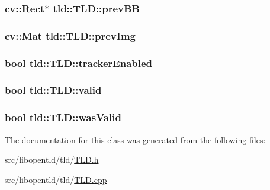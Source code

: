 \label{classtld_1_1_t_l_d_a98a1be08a4b630d85e5e60dc4bb78b13}
\hypertarget{classtld_1_1_t_l_d_adc7a217f04d600daffe8d025f424677f}{
\subsubsection[{prevBB}]{\setlength{\rightskip}{0pt plus 5cm}cv::Rect$\ast$ {\bf tld::TLD::prevBB}}}
\label{classtld_1_1_t_l_d_adc7a217f04d600daffe8d025f424677f}
\hypertarget{classtld_1_1_t_l_d_a7b402ff7a0260f00b8d3dbcea5c87efa}{
\subsubsection[{prevImg}]{\setlength{\rightskip}{0pt plus 5cm}cv::Mat {\bf tld::TLD::prevImg}}}
\label{classtld_1_1_t_l_d_a7b402ff7a0260f00b8d3dbcea5c87efa}
\hypertarget{classtld_1_1_t_l_d_ab94fab1f55f6ef122c9e3fcf4747ac50}{
\subsubsection[{trackerEnabled}]{\setlength{\rightskip}{0pt plus 5cm}bool {\bf tld::TLD::trackerEnabled}}}
\label{classtld_1_1_t_l_d_ab94fab1f55f6ef122c9e3fcf4747ac50}
\hypertarget{classtld_1_1_t_l_d_a2a238338a62dac450b2759f99d5ae304}{
\subsubsection[{valid}]{\setlength{\rightskip}{0pt plus 5cm}bool {\bf tld::TLD::valid}}}
\label{classtld_1_1_t_l_d_a2a238338a62dac450b2759f99d5ae304}
\hypertarget{classtld_1_1_t_l_d_a26e0c624178eb37a57cd0146efa6d262}{
\subsubsection[{wasValid}]{\setlength{\rightskip}{0pt plus 5cm}bool {\bf tld::TLD::wasValid}}}
\label{classtld_1_1_t_l_d_a26e0c624178eb37a57cd0146efa6d262}


The documentation for this class was generated from the following files:\begin{DoxyCompactItemize}
\item 
src/libopentld/tld/\hyperlink{_t_l_d_8h}{TLD.h}\item 
src/libopentld/tld/\hyperlink{_t_l_d_8cpp}{TLD.cpp}\end{DoxyCompactItemize}
